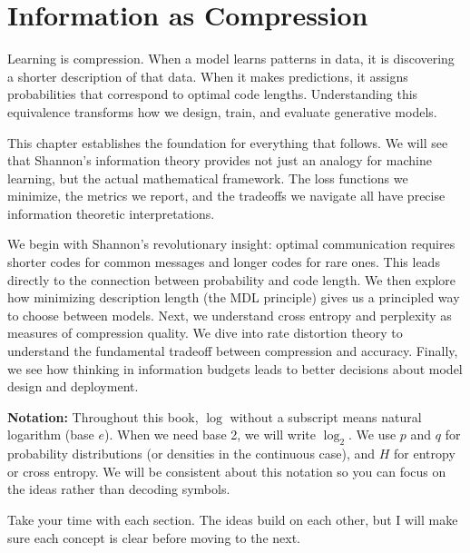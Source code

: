 
\chapter{Information as Compression}

\begin{keyinsight}
Learning is compression. When a model learns patterns in data, it is discovering a shorter description of that data. When it makes predictions, it assigns probabilities that correspond to optimal code lengths. Understanding this equivalence transforms how we design, train, and evaluate generative models.
\end{keyinsight}

\vspace{1.5em}

This chapter establishes the foundation for everything that follows. We will see that Shannon's information theory provides not just an analogy for machine learning, but the actual mathematical framework. The loss functions we minimize, the metrics we report, and the tradeoffs we navigate all have precise information theoretic interpretations.

We begin with Shannon's revolutionary insight: optimal communication requires shorter codes for common messages and longer codes for rare ones. This leads directly to the connection between probability and code length. We then explore how minimizing description length (the MDL principle) gives us a principled way to choose between models. Next, we understand cross entropy and perplexity as measures of compression quality. We dive into rate distortion theory to understand the fundamental tradeoff between compression and accuracy. Finally, we see how thinking in information budgets leads to better decisions about model design and deployment.

\textbf{Notation:} Throughout this book, $\log$ without a subscript means natural logarithm (base $e$). When we need base 2, we will write $\log_2$. We use $p$ and $q$ for probability distributions (or densities in the continuous case), and $H$ for entropy or cross entropy. We will be consistent about this notation so you can focus on the ideas rather than decoding symbols.

Take your time with each section. The ideas build on each other, but I will make sure each concept is clear before moving to the next.

